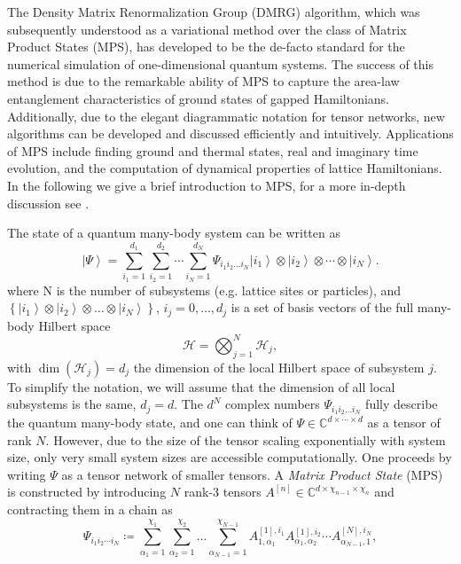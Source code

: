 The Density Matrix Renormalization Group (DMRG) algorithm, which was subsequently understood as a variational method over the class of Matrix Product States (MPS), has developed to be the de-facto standard for the numerical simulation of one-dimensional quantum systems. The success of this method is due to the remarkable ability of MPS to capture the area-law entanglement characteristics of ground states of gapped Hamiltonians. Additionally, due to the elegant diagrammatic notation for tensor networks, new algorithms can be developed and discussed efficiently and intuitively. Applications of MPS include finding ground and thermal states, real and imaginary time evolution, and the computation of dynamical properties of lattice Hamiltonians. In the following we give a brief introduction to MPS, for a more in-depth discussion see \cite{cite:DMRG_in_the_age_of_MPS, cite:practical_introduction_MPS_and_PEPS, cite:tenpy}. \par
The state of a quantum many-body system can be written as
\begin{equation}
	\left|\Psi\right\rangle = \sum_{i_1=1}^{d_1} \sum_{i_2=1}^{d_2} \cdots \sum_{i_N=1}^{d_N} \Psi_{i_1i_2\dots i_N} \left|i_1\right\rangle \otimes \left|i_2\right\rangle \otimes \cdots \otimes \left|i_N\right\rangle.
\end{equation}
where N is the number of subsystems (e.g. lattice sites or particles), and $\left\{\left|i_1\right\rangle \otimes \left|i_2\right\rangle \otimes \dots \otimes \left|i_N\right\rangle\right\}$, $i_j = 0, \dots, d_j$ is a set of basis vectors of the full many-body Hilbert space
\begin{equation}
	\mathcal{H} = \bigotimes_{j=1}^{N} \mathcal{H}_j,
\end{equation}
with $\dim\left(\mathcal{H}_j\right) = d_j$ the dimension of the local Hilbert space of subsystem $j$. To simplify the notation, we will assume that the dimension of all local subsystems is the same, $d_j = d$. The $d^N$ complex numbers $\Psi_{i_1i_2\dots i_N}$ fully describe the quantum many-body state, and one can think of $\Psi\in\mathbb{C}^{d\times\cdots\times d}$ as a tensor of rank $N$. However, due to the size of the tensor scaling exponentially with system size, only very small system sizes are accessible computationally. One proceeds by writing $\Psi$ as a tensor network of smaller tensors. A \textit{Matrix Product State} (MPS) is constructed by introducing $N$ rank-3 tensors $A^{[n]}\in\mathbb{C}^{d\times \chi_{n-1}\times \chi_{n}}$ and contracting them in a chain as
\begin{equation}
	\label{eq:MPS_open_boundary_conditions_general_definition}
	\Psi_{i_1i_2\cdots i_N} \coloneqq \sum_{\alpha_1=1}^{\chi_1} \sum_{\alpha_2=1}^{\chi_2}\dots\sum_{\alpha_{N-1}=1}^{\chi_{N-1}}A^{[1],i_1}_{1,\alpha_1} A^{[1],i_2}_{\alpha_1,\alpha_2} \cdots A^{[N],i_N}_{\alpha_{N-1},1},
\end{equation}
